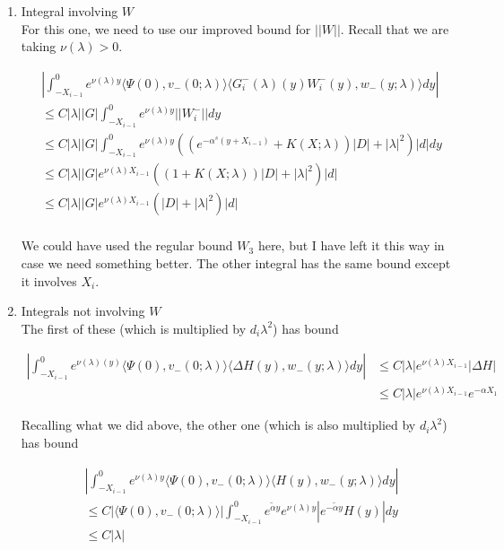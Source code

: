 \documentclass[12pt]{article}
\begin{document}
\begin{enumerate}
\begin{enumerate}

\item Integral involving $W$ \\

For this one, we need to use our improved bound for $||W||$. Recall that we are taking $\nu(\lambda) > 0$.

\begin{align*}
&\left| \int_{-X_{i-1}}^0
e^{\nu(\lambda)y} \langle \Psi(0), v_-(0; \lambda) \rangle \langle G_i^-(\lambda)(y)W_i^-(y), w_-(y; \lambda) \rangle dy \right| \\
&\leq C |\lambda| |G| \int_{-X_{i-1}}^0 e^{\nu(\lambda)y} ||W_i^-|| dy \\
&\leq C |\lambda| |G| \int_{-X_{i-1}}^0 e^{\nu(\lambda)y} ( (e^{-\alpha^s(y + X_{i-1})} + K(X; \lambda))|D| + |\lambda|^2 )|d| dy \\
&\leq C |\lambda| |G| e^{\nu(\lambda)X_{i-1}} (( 1 + K(X; \lambda))|D| + |\lambda|^2 )|d| \\
&\leq C |\lambda| |G| e^{\nu(\lambda)X_{i-1}} (|D| + |\lambda|^2 )|d| \\
\end{align*}

We could have used the regular bound $W_3$ here, but I have left it this way in case we need something better. The other integral has the same bound except it involves $X_i$.

\item Integrals not involving $W$ \\

The first of these (which is multiplied by $d_i \lambda^2$) has bound

\begin{align*}
\left| \int_{-X_{i-1}}^0
e^{\nu(\lambda)(y)} \langle \Psi(0), v_-(0; \lambda) \rangle \langle \Delta H(y), w_-(y; \lambda) \rangle dy \right| 
&\leq C |\lambda| e^{\nu(\lambda)X_{i-1}} |\Delta H| \\
&\leq C |\lambda| e^{\nu(\lambda)X_{i-1}} e^{-\alpha X_1}
\end{align*}

Recalling what we did above, the other one (which is also multiplied by $d_i \lambda^2$) has bound

\begin{align*}
&\left| \int_{-X_{i-1}}^0 e^{\nu(\lambda)y} \langle \Psi(0), v_-(0; \lambda) \rangle
\langle H(y), w_-(y; \lambda) \rangle dy \right| \\
&\leq C |\langle \Psi(0), v_-(0; \lambda) \rangle| \int_{-X_{i-1}}^0 e^{\tilde{\alpha}y}e^{\nu(\lambda)y} | e^{-\tilde{\alpha} y} H(y)|dy\\
&\leq C |\lambda| 
\end{align*}


\end{enumerate}
\end{enumerate}
\end{document}
